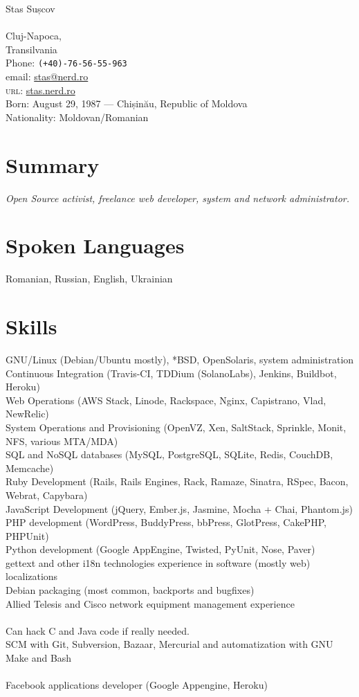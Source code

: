 \documentclass[10pt, a4paper]{article}
\begin{document}
{\LARGE Stas Sușcov}\\[1cm]
\\
 Cluj-Napoca,\\
Transilvania\\[.2cm]
Phone: \texttt{(+40)-76-56-55-963}\\[.2cm]
email: \href{mailto:stas@nerd.ro}{stas@nerd.ro}\\
\textsc{url}: \href{http://stas.nerd.ro/index.php/about/}{stas.nerd.ro}\\ 
\vfill
 Born:  August 29, 1987 --- Chișinău, Republic of Moldova\\
Nationality:  Moldovan/Romanian

\section*{Summary}
\emph{Open Source activist, freelance web developer, system and network administrator.} 

\section*{Spoken Languages}
 Romanian, Russian, English, Ukrainian

\section*{Skills}
GNU/Linux (Debian/Ubuntu mostly), *BSD, OpenSolaris, system administration\\
Continuous Integration (Travis-CI, TDDium (SolanoLabs), Jenkins, Buildbot, Heroku)\\
Web Operations (AWS Stack, Linode, Rackspace, Nginx, Capistrano, Vlad, NewRelic)\\
System Operations and Provisioning (OpenVZ, Xen, SaltStack, Sprinkle, Monit, NFS, various MTA/MDA)\\
SQL and NoSQL databases (MySQL, PostgreSQL, SQLite, Redis, CouchDB, Memcache)\\
Ruby Development (Rails, Rails Engines, Rack, Ramaze, Sinatra, RSpec, Bacon, Webrat, Capybara)\\
JavaScript Development (jQuery, Ember.js, Jasmine, Mocha + Chai, Phantom.js)\\
PHP development (WordPress, BuddyPress, bbPress, GlotPress, CakePHP, PHPUnit)\\
Python development (Google AppEngine, Twisted, PyUnit, Nose, Paver)\\
gettext and other i18n technologies experience in software (mostly web) localizations\\
Debian packaging (most common, backports and bugfixes)\\
Allied Telesis and Cisco network equipment management experience\\
\\
Can hack C and Java code if really needed.\\
SCM with Git, Subversion, Bazaar, Mercurial and automatization with GNU Make and Bash\\
\\
Facebook applications developer (Google Appengine, Heroku)
\end{document}
